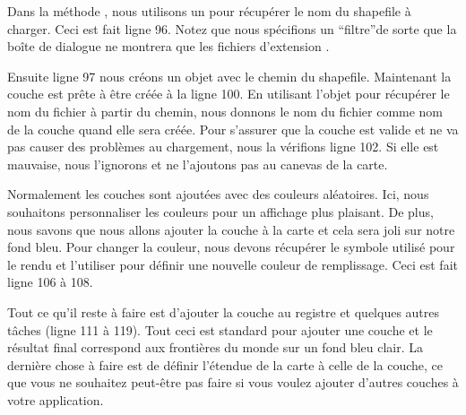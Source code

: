 Dans la m\'ethode , nous utilisons un  pour r\'ecup\'erer le nom du shapefile \`a charger. Ceci est fait ligne 96. Notez que nous sp\'ecifions un ``filtre''de sorte que la bo\^ite de dialogue ne montrera que les fichiers d'extension .

Ensuite ligne 97 nous cr\'eons un objet  avec le chemin du shapefile. Maintenant la couche est pr\^ete \`a \^etre cr\'e\'ee \`a la ligne 100. En utilisant l'objet  pour r\'ecup\'erer le nom du fichier \`a partir du chemin, nous donnons le nom du fichier comme nom de la couche quand elle sera cr\'e\'ee. Pour s'assurer que la couche est valide et ne va pas causer des probl\`emes au chargement, nous la v\'erifions ligne 102. Si elle est mauvaise, nous l'ignorons et ne l'ajoutons pas au canevas de la carte.

Normalement les couches sont ajout\'ees avec des couleurs al\'eatoires. Ici, nous souhaitons personnaliser les couleurs pour un affichage plus plaisant. De plus, nous savons que nous allons ajouter la couche  \`a la carte et cela sera joli sur notre fond bleu. Pour changer la couleur, nous devons r\'ecup\'erer le symbole utilis\'e pour le rendu et l'utiliser pour d\'efinir une nouvelle couleur de remplissage. Ceci est fait ligne 106 \`a 108.

Tout ce qu'il reste \`a faire est d'ajouter la couche au registre et quelques autres t\^aches (ligne 111 \`a 119). Tout ceci est standard pour ajouter une couche et le r\'esultat final correspond aux fronti\`eres du monde sur un fond bleu clair. La derni\`ere chose \`a faire est de d\'efinir l'\'etendue de la carte \`a celle de la couche, ce que vous ne souhaitez peut-\^etre pas faire si vous voulez ajouter d'autres couches \`a votre application.

